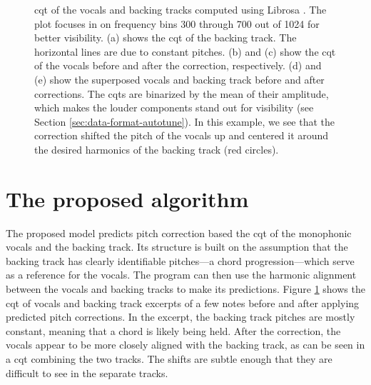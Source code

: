 \begin{figure}[t]
    \caption{
    \gls{cqt} of the vocals and backing tracks computed using Librosa \cite{mcfee2015librosa}. The plot focuses in on frequency bins 300 through 700 out of 1024 for better visibility. (a) shows the \gls{cqt} of the backing track. The horizontal lines are due to constant pitches. (b) and (c) show the \gls{cqt} of the vocals before and after the correction, respectively. (d) and (e) show the superposed vocals and backing track before and after corrections. The \gls{cqt}s are binarized by the mean of their amplitude, which makes the louder components stand out for visibility (see Section \ref{sec:data-format-autotune}). In this example, we see that the correction shifted the pitch of the vocals up and centered it around the desired harmonics of the backing track (red circles).
    }
    \label{fig:model-input-autotune}
\end{figure}

\section{The proposed algorithm}
\label{sec:proposed-autotune}
The proposed model predicts pitch correction based the \gls{cqt} of the monophonic vocals and the backing track. Its structure is built on the assumption that the backing track has clearly identifiable pitches---a chord progression---which serve as a reference for the vocals. The program can then use the harmonic alignment between the vocals and backing tracks to make its predictions. Figure \ref{fig:model-input-autotune} shows the \gls{cqt} of vocals and backing track excerpts of a few notes before and after applying predicted pitch corrections. In the excerpt, the backing track pitches are mostly constant, meaning that a chord is likely being held. After the correction, the vocals appear to be more closely aligned with the backing track, as can be seen in a \gls{cqt} combining the two tracks. The shifts are subtle enough that they are difficult to see in the separate tracks. 

